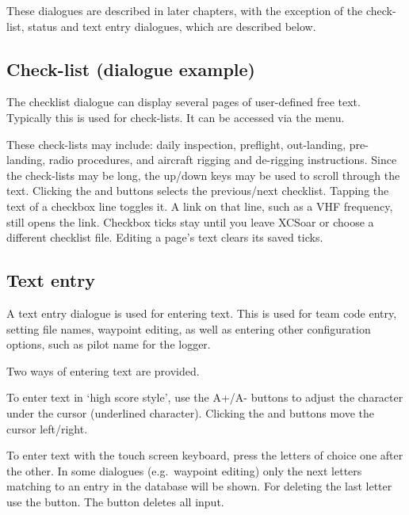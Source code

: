 These dialogues are described in later chapters, with the exception of the
check-list, status and text entry dialogues, which are described below.


\subsection*{Check-list (dialogue example)}\label{sec:checklist}

The checklist dialogue can display several pages of user-defined free text.
Typically this is used for check-lists. It can be accessed via the menu.

\blink{}

These check-lists may include: daily inspection, preflight,
out-landing, pre-landing, radio procedures, and aircraft rigging and
de-rigging instructions.  Since the check-lists may be long, the
up/down keys may be used to scroll through the text. Clicking the
\bmenuw{$<$} and \bmenuw{$>$} buttons selects the previous/next
checklist.  Tapping the text of a checkbox line toggles it.  A link
on that line, such as a VHF frequency, still opens the link.
Checkbox ticks stay until you leave XCSoar or choose a
different checklist file. Editing a page's text clears its saved ticks.


\subsection*{Text entry} \label{sec:textentry}

A text entry dialogue is used for entering text.  This is used for team
code entry, setting file names, waypoint editing, as well as entering
other configuration options, such as pilot name for the logger.

Two ways of entering text are provided. 

To enter text in `high score style', use the A+/A- buttons to adjust the 
character under the cursor (underlined character). Clicking the \button{$<$} 
and \button{$>$} buttons move the cursor left/right.  

To enter text with the touch screen keyboard, press the letters of choice 
one after the other. In some dialogues (e.g.\ waypoint editing) only the next
letters matching to an entry in the database will be shown. For deleting the 
last letter use the \button{$<-$} button. The  button deletes all input.

